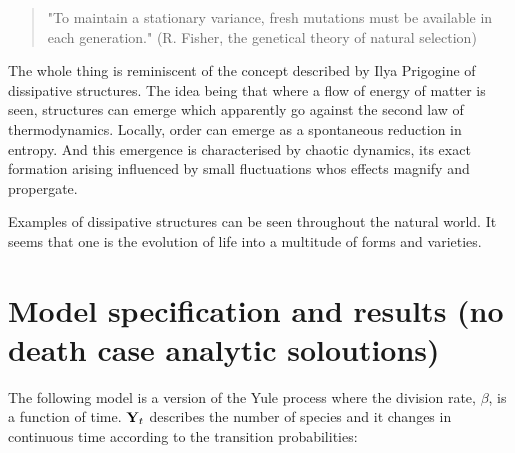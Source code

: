 \begin{quotation}
"To maintain a stationary variance, fresh mutations must be available in each generation." (R. Fisher, the genetical theory of natural selection)
\end{quotation}

The whole thing is reminiscent of the concept described by Ilya Prigogine of dissipative structures. The idea being that where a flow of energy of matter is seen, structures can emerge which apparently go against the second law of thermodynamics. Locally, order can emerge as a spontaneous reduction in entropy. And this emergence is characterised by chaotic dynamics, its exact formation arising influenced by small fluctuations whos effects magnify and propergate.\par
Examples of dissipative structures can be seen throughout the natural world. It seems that one is the evolution of life into a multitude of forms and varieties.





\section{Model specification and results (no death case analytic soloutions)}

The following model is a version of the Yule process where the division rate, $\beta$, is a function of time. ${{\bf Y}_t}$ describes the number of species and it changes in continuous time according to the transition probabilities:


